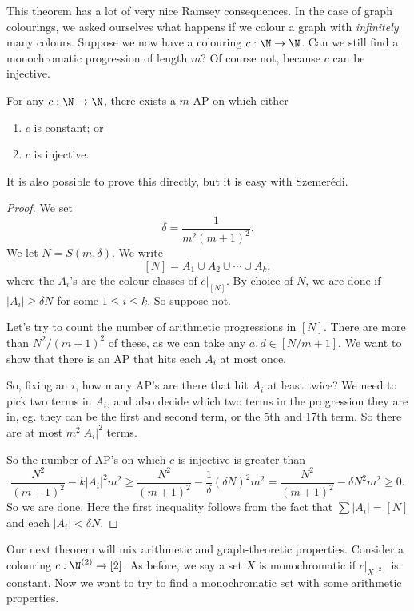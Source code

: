 \documentclass[a4paper]{article}
\begin{document}
This theorem has a lot of very nice Ramsey consequences. In the case of graph colourings, we asked ourselves what happens if we colour a graph with \emph{infinitely} many colours. Suppose we now have a colouring $c: \N \to \N$. Can we still find a monochromatic progression of length $m$? Of course not, because $c$ can be injective.

\begin{thm}
  For any $c: \N \to \N$, there exists a $m$-AP on which either
  \begin{enumerate}
    \item $c$ is constant; or
    \item $c$ is injective.
  \end{enumerate}
\end{thm}
It is also possible to prove this directly, but it is easy with Szemer\'edi.

\begin{proof}
  We set
  \[
    \delta = \frac{1}{m^2(m + 1)^2}.
  \]
  We let $N = S(m, \delta)$. We write
  \[
    [N] = A_1 \cup A_2 \cup \cdots \cup A_k,
  \]
  where the $A_i$'s are the colour-classes of $c|_{[N]}$. By choice of $N$, we are done if $|A_i| \geq \delta N$ for some $1 \leq i \leq k$. So suppose not.

  Let's try to count the number of arithmetic progressions in $[N]$. There are more than $N^2/(m + 1)^2$ of these, as we can take any $a, d \in [N/m + 1]$. We want to show that there is an AP that hits each $A_i$ at most once.

  So, fixing an $i$, how many AP's are there that hit $A_i$ at least twice? We need to pick two terms in $A_i$, and also decide which two terms in the progression they are in, eg. they can be the first and second term, or the 5th and 17th term. So there are at most $m^2 |A_i|^2$ terms.

  So the number of AP's on which $c$ is injective is greater than
  \[
    \frac{N^2}{(m + 1)^2} - k |A_i|^2 m^2 \geq \frac{N^2}{(m + 1)^2} - \frac{1}{\delta} (\delta N)^2 m^2 = \frac{N^2}{(m + 1)^2} - \delta N^2 m^2 \geq 0.
  \]
  So we are done. Here the first inequality follows from the fact that $\sum |A_i| = [N]$ and each $|A_i| < \delta N$.
\end{proof}

Our next theorem will mix arithmetic and graph-theoretic properties. Consider a colouring $c: \N^{(2)} \to [2]$. As before, we say a set $X$ is monochromatic if $c|_{X^{(2)}}$ is constant. Now we want to try to find a monochromatic set with some arithmetic properties.
\end{document}
